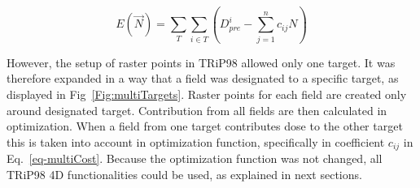 \documentclass[type=dr, dr=rernat, accentcolor=tud7b,colorbacktitle, bigchapter, openright, twoside, 12pt ]{tudthesis}
\begin{document}
\begin{equation}
\label{eq-multiCost}
 E(\vec{N}) = \sum_{T} \sum_{i\in T} \left( D_{pre}^{i} -\sum_{j=1}^n c_{ij}N\right)
\end{equation}

However, the setup of raster points in TRiP98 allowed only one target. It was therefore expanded in a way that a field was designated to a specific target, as displayed in Fig~\ref{Fig:multiTargets}. 
Raster points for each field are created only around designated target. Contribution from all fields are then calculated in optimization. When a field from one target contributes 
dose to the other target this is taken into account in optimization function, specifically in coefficient $c_{ij}$ in Eq.~\ref{eq-multiCost}. Because the optimization function was not changed, 
all TRiP98 4D functionalities could be used, as explained in next sections.
\end{document}
